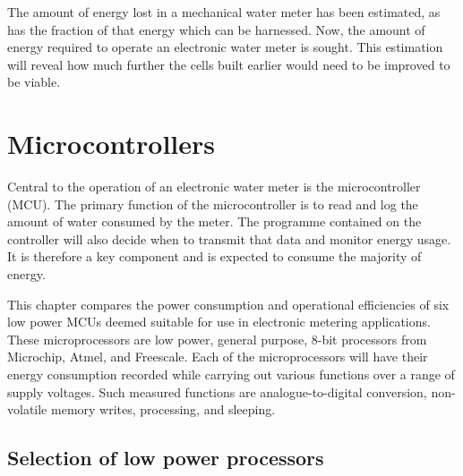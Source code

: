 
The amount of energy lost in a mechanical water meter has been estimated, as has the fraction of that energy which can be harnessed.
Now, the amount of energy required to operate an electronic water meter is sought.
This estimation will reveal how much further the cells built earlier would need to be improved to be viable.

\section{Microcontrollers}

  Central to the operation of an electronic water meter is the microcontroller (MCU).
  The primary function of the microcontroller is to read and log the amount of water consumed by the meter.
  The programme contained on the controller will also decide when to transmit that data and monitor energy usage.
  It is therefore a key component and is expected to consume the majority of energy.

  This chapter compares the power consumption and operational efficiencies of six low power MCUs deemed suitable for use in electronic metering applications.
  These microprocessors are low power, general purpose, 8-bit processors from Microchip, Atmel, and Freescale.
  Each of the microprocessors will have their energy consumption recorded while carrying out various functions over a range of supply voltages.
  Such measured functions are analogue-to-digital conversion, non-volatile memory writes, processing, and sleeping.


  \subsection{Selection of low power processors}


